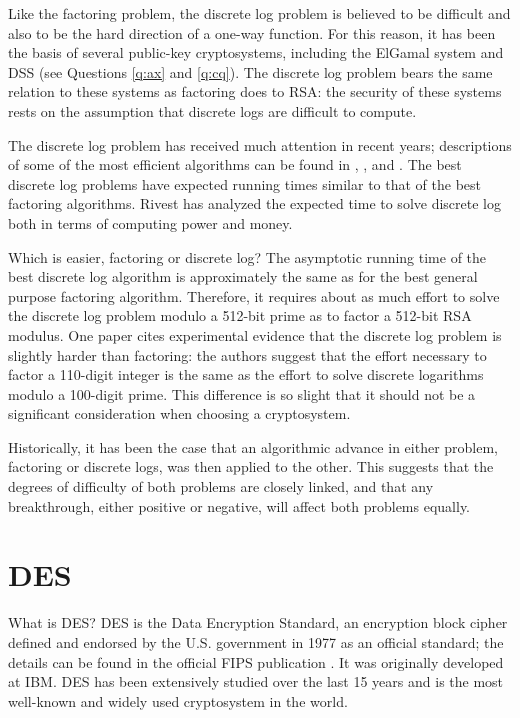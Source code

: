 Like the factoring problem, the discrete log problem is believed to be
difficult and also to be the hard direction of a one-way function. For 
this reason, it has been the basis of several public-key cryptosystems,
including the ElGamal system and DSS (see Questions \ref{q:ax}
and \ref{q:cq}). The discrete log problem bears the same relation to
these systems as factoring does to RSA: the security of these systems 
rests on the assumption that discrete logs are difficult to compute.

The discrete log problem has received much attention in recent years; 
descriptions of some of the most efficient algorithms can be found in 
\cite{lenstra-survey}, \cite{coppersmith-o-s}, and \cite{gordon-nfs-dlog}. 
The best discrete log problems have expected running times similar to 
that of the best factoring algorithms. Rivest \cite{rivest-dss-response} 
has analyzed the expected time to solve discrete log both in terms of 
computing power and money.

{Which is easier, factoring or discrete log?}
The asymptotic running time of the best discrete log algorithm is
approximately the same as for the best general purpose factoring
algorithm. Therefore, it requires about as much effort to solve
the discrete log problem modulo a 512-bit prime as to factor a 
512-bit RSA modulus.  One paper \cite{lamacchia} cites experimental
evidence that the discrete log problem is slightly harder than
factoring: the authors suggest that the effort necessary to factor 
a 110-digit integer is the same as the effort to solve discrete 
logarithms modulo a 100-digit prime. This difference is so slight
that it should not be a significant consideration when choosing a
cryptosystem.

Historically, it has been the case that an algorithmic advance in either 
problem, factoring or discrete logs, was then applied to the other. This 
suggests that the degrees of difficulty of both problems are closely 
linked, and that any breakthrough, either positive or negative, will affect 
both problems equally.

\section {DES}
{What is DES?}
DES is the Data Encryption Standard, an encryption block cipher defined 
and endorsed by the U.S. government in 1977 as an official standard;
the details can be found in the official FIPS publication \cite{nist-des-88}.
It was originally developed at IBM. DES has been extensively studied over 
the last 15 years and is the most well-known and widely used cryptosystem 
in the world. 

